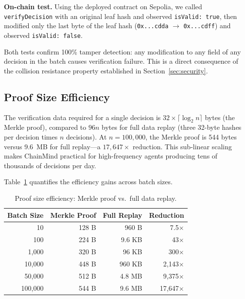 \documentclass[manuscript,nonacm]{acmart}
\begin{document}
\textbf{On-chain test.}
Using the deployed contract on Sepolia, we called \texttt{verifyDecision} with an original leaf hash and observed \texttt{isValid: true}, then modified only the last byte of the leaf hash (\texttt{0x...cdda} $\rightarrow$ \texttt{0x...cdff}) and observed \texttt{isValid: false}.

Both tests confirm 100\% tamper detection: any modification to any field of any decision in the batch causes verification failure.
This is a direct consequence of the collision resistance property established in Section~\ref{sec:security}.

\subsection{Proof Size Efficiency}

The verification data required for a single decision is $32 \times \lceil \log_2 n \rceil$ bytes (the Merkle proof), compared to $96n$ bytes for full data replay (three 32-byte hashes per decision times $n$ decisions).
At $n = 100{,}000$, the Merkle proof is 544 bytes versus 9.6~MB for full replay---a $17{,}647\times$ reduction.
This sub-linear scaling makes ChainMind practical for high-frequency agents producing tens of thousands of decisions per day.

Table~\ref{tab:proofscale} quantifies the efficiency gains across batch sizes.

\begin{table}[t]
\centering
\caption{Proof size efficiency: Merkle proof vs.\ full data replay.}
\label{tab:proofscale}
\begin{tabular}{@{}rrrr@{}}
\toprule
\textbf{Batch Size} & \textbf{Merkle Proof} & \textbf{Full Replay} & \textbf{Reduction} \\
\midrule
10     & 128 B     & 960 B       & 7.5$\times$     \\
100    & 224 B     & 9.6 KB      & 43$\times$      \\
1,000  & 320 B     & 96 KB       & 300$\times$     \\
10,000 & 448 B     & 960 KB      & 2,143$\times$   \\
50,000 & 512 B     & 4.8 MB      & 9,375$\times$   \\
100,000 & 544 B    & 9.6 MB      & 17,647$\times$  \\
\bottomrule
\end{tabular}
\end{table}


\end{document}
